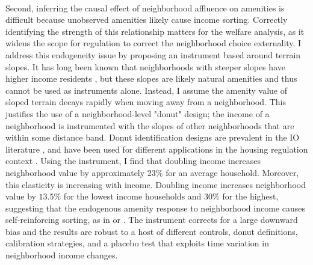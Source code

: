 \documentclass[12pt]{article}
\begin{document}
	\paragraph*{}
	Second, inferring the causal effect of neighborhood affluence on amenities is difficult because unobserved amenities likely cause income sorting. Correctly identifying the strength of this relationship matters for the welfare analysis, as it widens the scope for regulation to correct the neighborhood choice externality. I address this endogeneity issue by proposing an instrument based around terrain slopes. It has long been known that neighborhoods with steeper slopes have higher income residents \citep{saiz2010}, but these slopes are likely natural amenities and thus cannot be used as instruments alone. Instead, I assume the amenity value of sloped terrain decays rapidly when moving away from a neighborhood. This justifies the use of a neighborhood-level "donut" design; the income of a neighborhood is instrumented with the slopes of other neighborhoods that are within some distance band. Donut identification designs are prevalent in the IO literature \citep{BFMJPE}, and have been used for different applications in the housing regulation context \citep{anagoletal2021}. Using the instrument, I find that doubling income increases neighborhood value by approximately $23\%$ for an average household. Moreover, this elasticity is increasing with income. Doubling income increases neighborhood value by $13.5\%$ for the lowest income households and $30\%$ for the highest, suggesting that the endogenous amenity response to neighborhood income causes self-reinforcing sorting, as in \cite{diamond2016} or \cite{su2021}. The instrument corrects for a large downward bias and the results are robust to a host of different controls, donut definitions, calibration strategies, and a placebo test that exploits time variation in neighborhood income changes.
\end{document}
